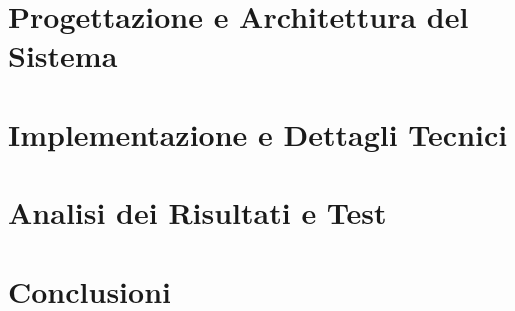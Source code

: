 \documentclass[a4paper, 11pt, oneside, openright]{book}
\begin{document}
    \chapter[Caso di studio]{Progettazione e Architettura del Sistema}
    \label{ch:progettazione-e-architettura-del-sistema}
    

    \chapter[Implementazione e Dettagli Tecnici]{Implementazione e Dettagli Tecnici}
    \label{ch:implementazione-e-dettagli-tecnici}
    

    \chapter[Analisi dei Risultati e Test]{Analisi dei Risultati e Test}
    \label{ch:analisi-dei-risultati-e-test}
    

    \chapter[Conclusioni]{Conclusioni}
    \label{ch:conclusioni}
    

    \newpage
    \printbibliography
\end{document}
